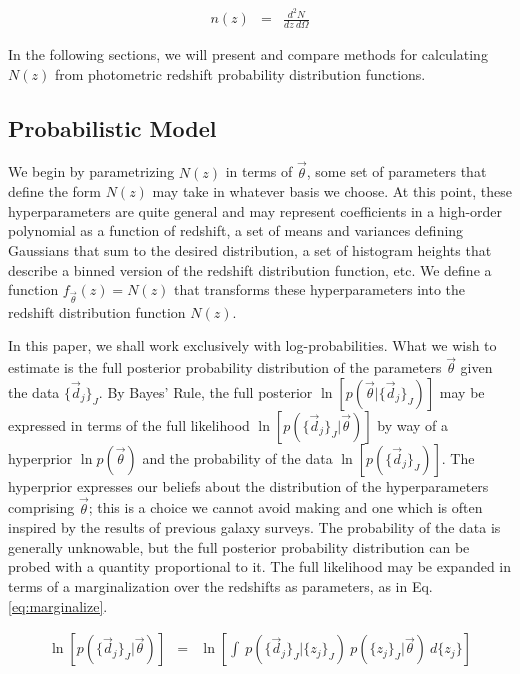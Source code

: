 \documentclass[preprint]{aastex}
\begin{document}
\begin{eqnarray}
\label{eq:density}
n(z) &=& \frac{d^{2}N}{dz\ d\Omega}
\end{eqnarray}

In the following sections, we will present and compare methods for calculating 
$N(z)$ from photometric redshift probability distribution functions.  

\clearpage
\subsection{Probabilistic Model}
\label{sec:prob}

We begin by parametrizing $N(z)$ in terms of $\vec{\theta}$, some set of 
parameters that define the form $N(z)$ may take in whatever basis we choose.  
At this point, these hyperparameters are quite general and may represent 
coefficients in a high-order polynomial as a function of redshift, a set of 
means and variances defining Gaussians that sum to the desired distribution, a 
set of histogram heights that describe a binned version of the redshift 
distribution function, etc.  We define a function $f_{\vec{\theta}}(z)=N(z)$ 
that transforms these hyperparameters into the redshift distribution function 
$N(z)$.

In this paper, we shall work exclusively with log-probabilities.  What we wish 
to estimate is the full posterior probability distribution of the parameters 
$\vec{\theta}$ given the data $\{\vec{d}_{j}\}_{J}$.  By Bayes' Rule, the full 
posterior $\ln[p(\vec{\theta}|\{\vec{d}_{j}\}_{J})]$ may be expressed in terms 
of the full likelihood $\ln[p(\{\vec{d}_{j}\}_{J}|\vec{\theta})]$ by way of a 
hyperprior $\ln p(\vec{\theta})$ and the probability of the data 
$\ln[p(\{\vec{d}_{j}\}_{J})]$.  The hyperprior expresses our beliefs about the 
distribution of the hyperparameters comprising $\vec{\theta}$; this is a choice 
we cannot avoid making and one which is often inspired by the results of 
previous galaxy surveys.  The probability of the data is generally unknowable, 
but the full posterior probability distribution can be probed with a quantity 
proportional to it.  The full likelihood may be expanded in terms of a 
marginalization over the redshifts as parameters, as in Eq. 
\ref{eq:marginalize}.  

\begin{eqnarray}
\label{eq:marginalize}
\ln[p(\{\vec{d}_{j}\}_{J}|\vec{\theta})] &=& \ln\left[\int\ 
p(\{\vec{d}_{j}\}_{J}|\{z_{j}\}_{J})\ p(\{z_{j}\}_{J}|\vec{\theta})\ 
d\{z_{j}\}\right]
\end{eqnarray}
\end{document}
